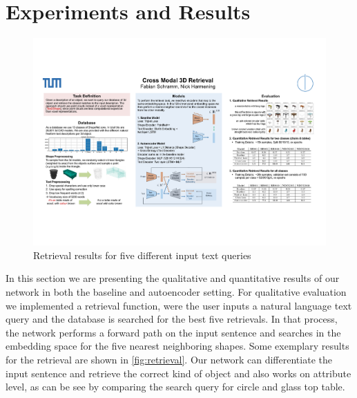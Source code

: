 \documentclass[10pt,twocolumn,letterpaper]{article}
\begin{document}
\section{Experiments and Results}
\begin{figure}[t]%
	\centering
	\includegraphics[width=1\linewidth]{fig5.pdf}
	\caption[]{Retrieval results for five different input text queries}
	\label{fig:retrieval}
\end{figure}

In this section we are presenting the qualitative and quantitative results of our network in both the baseline and autoencoder setting. For qualitative evaluation we implemented a retrieval function, were the user inputs a natural language text query and the database is searched for the best five retrievals. In that process, the network performs a forward path on the input sentence and searches in the embedding space for the five nearest neighboring shapes. Some exemplary results for the retrieval are shown in \autoref{fig:retrieval}. Our network can differentiate the input sentence and retrieve the correct kind of object and also works on attribute level, as can be see by comparing the search query for circle and glass top table.
\end{document}
